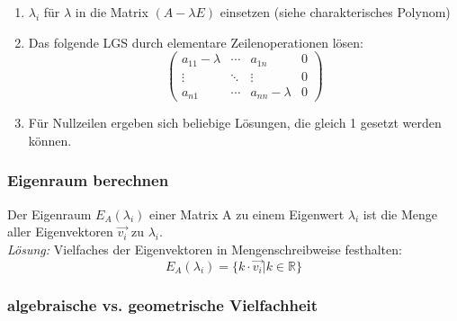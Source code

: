 \begin{enumerate}
    \item \(\lambda_i\) für \(\lambda\) in die Matrix \((A-\lambda E)\) einsetzen (siehe charakterisches Polynom)
    \item Das folgende LGS durch elementare Zeilenoperationen lösen:\\
        \begin{equation*}
            \left( 
            \begin{array}{ccc|c}
                a_{11} - \lambda & \cdots & a_{1n} & 0\\
                \vdots & \ddots & \vdots & 0\\
                a_{n1} & \cdots & a_{nn} - \lambda & 0
            \end{array}
            \right)
        \end{equation*}
    \item Für Nullzeilen ergeben sich beliebige Lösungen, die gleich 1 gesetzt werden können.
\end{enumerate}


\subsubsection{Eigenraum berechnen}

Der Eigenraum \(E_A(\lambda_i)\) einer Matrix A zu einem Eigenwert \(\lambda_i\) ist die Menge aller Eigenvektoren \(\vec{v_i}\) zu \(\lambda_i\).\\

\textit{Lösung:}
Vielfaches der Eigenvektoren in Mengenschreibweise festhalten:\\

\begin{equation*}
    E_A(\lambda_i) = \{ k \cdot \vec{v_i} | k \in \mathbb{R} \}   
\end{equation*}

\subsubsection{algebraische vs. geometrische Vielfachheit}
